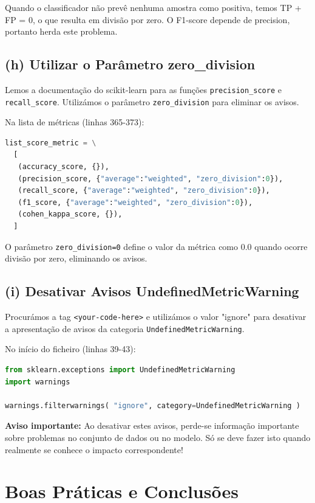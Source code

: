 \documentclass[12pt,a4paper]{article}
\begin{document}
Quando o classificador não prevê nenhuma amostra como positiva, temos TP + FP = 0, o que resulta em divisão por zero. O F1-score depende de precision, portanto herda este problema.

\subsection{(h) Utilizar o Parâmetro zero\_division}

Lemos a documentação do scikit-learn para as funções \texttt{precision\_score} e \texttt{recall\_score}. Utilizámos o parâmetro \texttt{zero\_division} para eliminar os avisos.

Na lista de métricas (linhas 365-373):

\begin{lstlisting}[language=Python]
list_score_metric = \
  [
   (accuracy_score, {}),
   (precision_score, {"average":"weighted", "zero_division":0}),
   (recall_score, {"average":"weighted", "zero_division":0}),
   (f1_score, {"average":"weighted", "zero_division":0}),
   (cohen_kappa_score, {}),
  ]
\end{lstlisting}

O parâmetro \texttt{zero\_division=0} define o valor da métrica como 0.0 quando ocorre divisão por zero, eliminando os avisos.

\subsection{(i) Desativar Avisos UndefinedMetricWarning}

Procurámos a tag \texttt{<your-code-here>} e utilizámos o valor "ignore" para desativar a apresentação de avisos da categoria \texttt{UndefinedMetricWarning}.

No início do ficheiro (linhas 39-43):

\begin{lstlisting}[language=Python]
from sklearn.exceptions import UndefinedMetricWarning
import warnings

warnings.filterwarnings( "ignore", category=UndefinedMetricWarning )
\end{lstlisting}

\textbf{Aviso importante:} Ao desativar estes avisos, perde-se informação importante sobre problemas no conjunto de dados ou no modelo. Só se deve fazer isto quando realmente se conhece o impacto correspondente!

\section{Boas Práticas e Conclusões}
\end{document}
